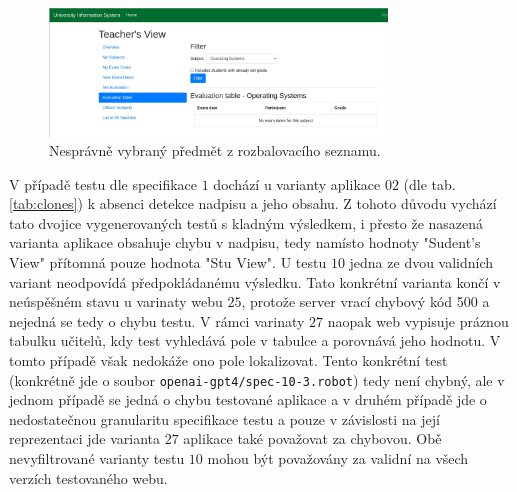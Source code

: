 \documentclass[czech, ma, kiv, he, iso690alph, pdf, viewonly]{fasthesis}
\begin{document}
            \begin{figure}
                \includegraphics[width=0.8\textwidth]{pic/wrong_subject_select.png}
                \centering
                \caption{Nesprávně vybraný předmět z rozbalovacího seznamu.}
                \label{fig:wrong_subject_select}
            \end{figure}

            V případě testu dle specifikace \(1\) dochází u varianty aplikace \(02\) (dle tab. \ref{tab:clones}) k absenci detekce nadpisu a jeho obsahu. Z tohoto důvodu vychází tato dvojice vygenerovaných testů s kladným výsledkem, i přesto že nasazená varianta aplikace obsahuje chybu v nadpisu, tedy namísto hodnoty "Sudent's View" přítomná pouze hodnota "Stu View". U testu \(10\) jedna ze dvou validních variant neodpovídá předpokládanému výsledku. Tato konkrétní varianta končí v neúspěšném stavu u varinaty webu \(25\), protože server vrací chybový kód 500 a nejedná se tedy o chybu testu. V rámci varinaty \(27\) naopak web vypisuje práznou tabulku učitelů, kdy test vyhledává pole v tabulce a porovnává jeho hodnotu. V tomto případě však nedokáže ono pole lokalizovat. Tento konkrétní test (konkrétně jde o soubor \verb|openai-gpt4/spec-10-3.robot|) tedy není chybný, ale v jednom případě se jedná o chybu testované aplikace a v druhém případě jde o nedostatečnou granularitu specifikace testu a pouze v závislosti na její reprezentaci jde varianta \(27\) aplikace také považovat za chybovou. Obě nevyfiltrované varianty testu \(10\) mohou být považovány za validní na všech verzích testovaného webu.

\end{document}
